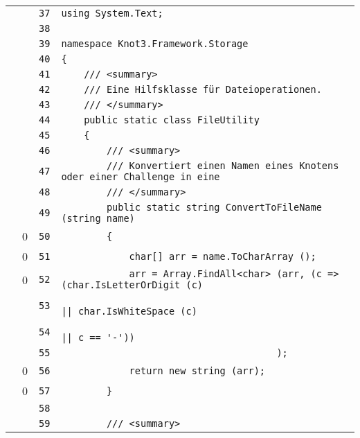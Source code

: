 \documentclass[a4paper,10pt]{article}
\begin{document}
\begin{longtable}[l]{lrrl}
\cellcolor{gray} &  & \verb~37~ & \verb~using System.Text;~\\
\cellcolor{gray} &  & \verb~38~ & \verb~~\\
\cellcolor{gray} &  & \verb~39~ & \verb~namespace Knot3.Framework.Storage~\\
\cellcolor{gray} &  & \verb~40~ & \verb~{~\\
\cellcolor{gray} &  & \verb~41~ & \verb~    /// <summary>~\\
\cellcolor{gray} &  & \verb~42~ & \verb~    /// Eine Hilfsklasse für Dateioperationen.~\\
\cellcolor{gray} &  & \verb~43~ & \verb~    /// </summary>~\\
\cellcolor{gray} &  & \verb~44~ & \verb~    public static class FileUtility~\\
\cellcolor{gray} &  & \verb~45~ & \verb~    {~\\
\cellcolor{gray} &  & \verb~46~ & \verb~        /// <summary>~\\
\cellcolor{gray} &  & \verb~47~ & \verb~        /// Konvertiert einen Namen eines Knotens oder einer Challenge in eine~\\
\cellcolor{gray} &  & \verb~48~ & \verb~        /// </summary>~\\
\cellcolor{gray} &  & \verb~49~ & \verb~        public static string ConvertToFileName (string name)~\\
\cellcolor{red} & 0 & \verb~50~ & \verb~        {~\\
\cellcolor{red} & 0 & \verb~51~ & \verb~            char[] arr = name.ToCharArray ();~\\
\cellcolor{red} & 0 & \verb~52~ & \verb~            arr = Array.FindAll<char> (arr, (c => (char.IsLetterOrDigit (c)~\\
\cellcolor{gray} &  & \verb~53~ & \verb~                                                   || char.IsWhiteSpace (c)~\\
\cellcolor{gray} &  & \verb~54~ & \verb~                                                   || c == '-'))~\\
\cellcolor{gray} &  & \verb~55~ & \verb~                                      );~\\
\cellcolor{red} & 0 & \verb~56~ & \verb~            return new string (arr);~\\
\cellcolor{red} & 0 & \verb~57~ & \verb~        }~\\
\cellcolor{gray} &  & \verb~58~ & \verb~~\\
\cellcolor{gray} &  & \verb~59~ & \verb~        /// <summary>~\\

\end{longtable}
\end{document}
